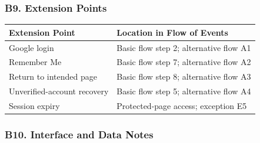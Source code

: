 \documentclass[12pt]{article}
\renewcommand{\baselinestretch}{1.5}
\begin{document}
\hypertarget{sec:b9-extension-points}{}
\subsubsection*{B9. Extension Points}
\par\medskip

\begingroup
\small
\renewcommand{\baselinestretch}{1.0}\selectfont
\renewcommand{\arraystretch}{1.15}
\setlength{\tabcolsep}{6pt}
\begin{longtable}{|>{\raggedright\arraybackslash}p{}|>{\raggedright\arraybackslash}p{}|}
\hline
\textbf{Extension Point} & \textbf{Location in Flow of Events} \\ \hline
\endhead
Google login & Basic flow step 2; alternative flow A1 \\ \hline
Remember Me & Basic flow step 7; alternative flow A2 \\ \hline
Return to intended page & Basic flow step 8; alternative flow A3 \\ \hline
Unverified-account recovery & Basic flow step 5; alternative flow A4 \\ \hline
Session expiry & Protected-page access; exception E5 \\ \hline
\end{longtable}
\endgroup
\par\medskip

\hypertarget{sec:b10-interface-and-data-notes}{}
\subsubsection*{B10. Interface and Data Notes}
\par\medskip
\end{document}
